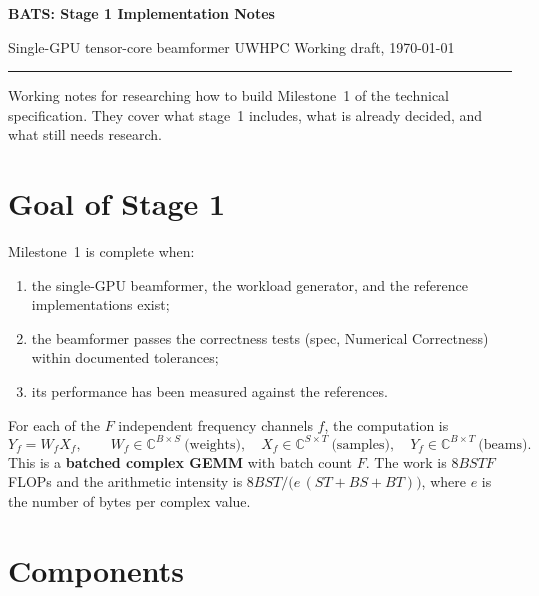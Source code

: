 \documentclass[10pt,letterpaper]{article}
\begin{document}
{\LARGE\bfseries BATS: Stage 1 Implementation Notes\par}
\vspace{2pt}
{\large Single-GPU tensor-core beamformer \hfill UWHPC \textperiodcentered{} Working draft, \today\par}
\vspace{-4pt}
\noindent\rule{\linewidth}{0.6pt}

Working notes for researching how to build Milestone~1 of the technical specification. They cover what stage~1 includes, what is already decided, and what still needs research.

\section*{Goal of Stage 1}

Milestone~1 is complete when:
\begin{enumerate}
  \item the single-GPU beamformer, the workload generator, and the reference implementations exist;
  \item the beamformer passes the correctness tests (spec, Numerical Correctness) within documented tolerances;
  \item its performance has been measured against the references.
\end{enumerate}

For each of the $F$ independent frequency channels $f$, the computation is
\[
  Y_f = W_f X_f, \qquad
  W_f \in \mathbb{C}^{B \times S}\ \text{(weights)}, \quad
  X_f \in \mathbb{C}^{S \times T}\ \text{(samples)}, \quad
  Y_f \in \mathbb{C}^{B \times T}\ \text{(beams)}.
\]
This is a \textbf{batched complex GEMM} with batch count $F$. The work is $8BSTF$ FLOPs and the arithmetic intensity is $8BST / \big(e\,(ST + BS + BT)\big)$, where $e$ is the number of bytes per complex value.

\section*{Components}
\end{document}
